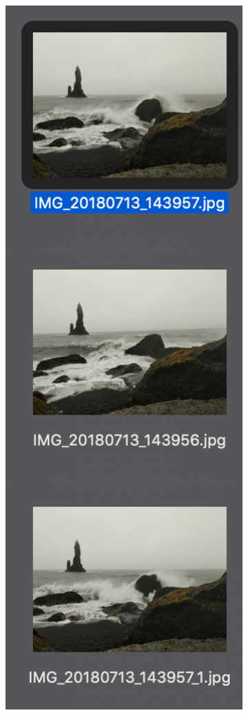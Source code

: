 \documentclass[12pt]{article}
\begin{document}
\begin{figure}[H]
\begin{subfigure}[b]{.33\textwidth}
		\includegraphics[width=.75\textwidth]{images/correct_match_3.png}

\end{subfigure}
\end{figure}
\end{document}

